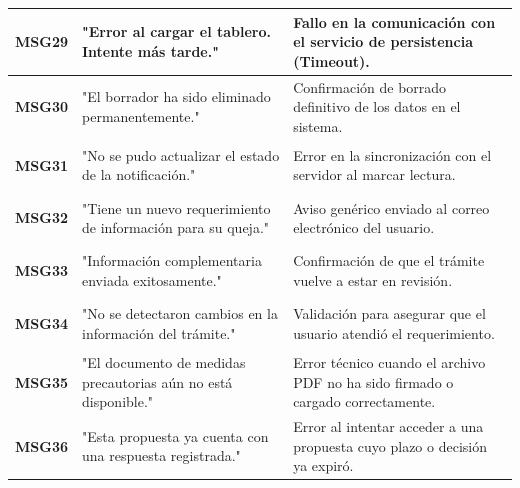 \begin{longtable}{|p{2cm}|p{6cm}|p{6cm}|}
    \hypertarget{msg:MSG29}{\textbf{MSG29}} & "Error al cargar el tablero. Intente más tarde." & Fallo en la comunicación con el servicio de persistencia (Timeout). \\ \hline
    \hypertarget{msg:MSG30}{\textbf{MSG30}} & "El borrador ha sido eliminado permanentemente." & Confirmación de borrado definitivo de los datos en el sistema. \\ \hline
    \hypertarget{msg:MSG31}{\textbf{MSG31}} & "No se pudo actualizar el estado de la notificación." & Error en la sincronización con el servidor al marcar lectura. \\ \hline
    \hypertarget{msg:MSG32}{\textbf{MSG32}} & "Tiene un nuevo requerimiento de información para su queja." & Aviso genérico enviado al correo electrónico del usuario. \\ \hline
    \hypertarget{msg:MSG33}{\textbf{MSG33}} & "Información complementaria enviada exitosamente." & Confirmación de que el trámite vuelve a estar en revisión. \\ \hline
    \hypertarget{msg:MSG34}{\textbf{MSG34}} & "No se detectaron cambios en la información del trámite." & Validación para asegurar que el usuario atendió el requerimiento. \\ \hline
    \hypertarget{msg:MSG35}{\textbf{MSG35}} & "El documento de medidas precautorias aún no está disponible." & Error técnico cuando el archivo PDF no ha sido firmado o cargado correctamente. \\ \hline
    \hypertarget{msg:MSG36}{\textbf{MSG36}} & "Esta propuesta ya cuenta con una respuesta registrada." & Error al intentar acceder a una propuesta cuyo plazo o decisión ya expiró. \\ \hline

\end{longtable}